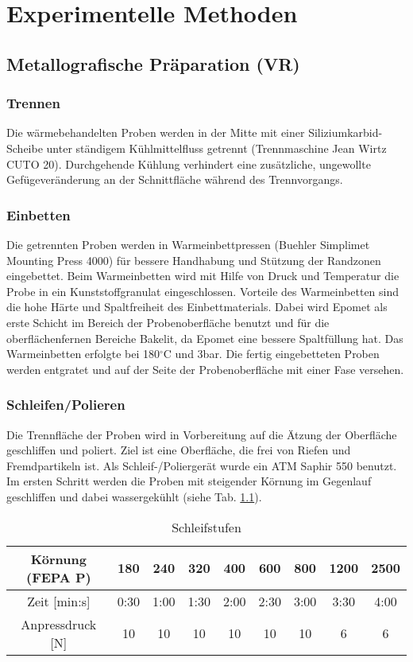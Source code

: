 \chapter{Experimentelle Methoden}

\section {Metallografische Präparation (VR)}

\subsection{Trennen}
Die wärmebehandelten Proben werden in der Mitte mit einer Siliziumkarbid-Scheibe unter ständigem Kühlmittelfluss getrennt (Trennmaschine Jean Wirtz CUTO 20). Durchgehende Kühlung  verhindert eine zusätzliche, ungewollte Gefügeveränderung an der Schnittfläche während des Trennvorgangs.


\subsection{Einbetten}
Die getrennten Proben werden in Warmeinbettpressen (Buehler Simplimet Mounting Press 4000) für bessere Handhabung und Stützung der Randzonen eingebettet. Beim Warmeinbetten wird mit Hilfe von Druck und Temperatur die Probe in ein Kunststoffgranulat eingeschlossen. Vorteile des Warmeinbetten sind die hohe Härte und Spaltfreiheit des Einbettmaterials. Dabei wird Epomet als erste Schicht im Bereich der Probenoberfläche benutzt und für die oberflächenfernen Bereiche Bakelit, da Epomet eine bessere Spaltfüllung hat. Das Warmeinbetten erfolgte bei 180$^\circ$C und 3bar. 
Die fertig eingebetteten Proben werden entgratet und auf der Seite der Probenoberfläche mit einer Fase versehen.  


\subsection{Schleifen/Polieren}

Die Trennfläche der Proben wird in Vorbereitung auf die Ätzung der Oberfläche geschliffen und poliert. Ziel ist eine Oberfläche, die frei von Riefen und Fremdpartikeln ist. Als Schleif-/Poliergerät wurde ein ATM Saphir 550 benutzt.
Im ersten Schritt werden die Proben mit steigender Körnung im Gegenlauf geschliffen und dabei wassergekühlt (siehe Tab. \ref{tab:Schleifstufen}). 

\begin{table}[h]
	\centering
	\begin{tabular}{|c|c|c|c|c|c|c|c|c|}
		
		\hline 
		Körnung (FEPA P) & 180 & 240 & 320 & 400 & 600 & 800 & 1200 & 2500 \\ 
		\hline 
		Zeit [min:s] & 0:30 & 1:00 & 1:30 & 2:00 & 2:30 & 3:00 & 3:30 & 4:00 \\ 
		\hline 
		Anpressdruck [N] & 10&10&10&10&10&10&6&6\\
		\hline
	\end{tabular} 
	\caption{Schleifstufen}
	\label{tab:Schleifstufen}
\end{table}

